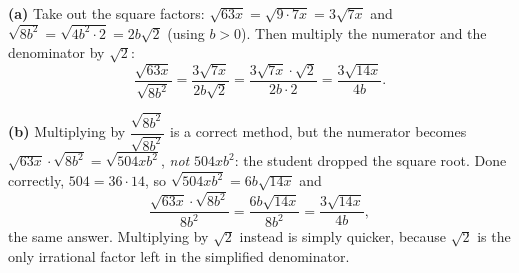 \textbf{(a)} Take out the square factors: $\sqrt{63x}=\sqrt{9\cdot7x}=3\sqrt{7x}$ and $\sqrt{8b^2}=\sqrt{4b^2\cdot2}=2b\sqrt2$ (using $b>0$). Then multiply the numerator and the denominator by $\sqrt2$:
\[
\dfrac{\sqrt{63x}}{\sqrt{8b^2}}=\dfrac{3\sqrt{7x}}{2b\sqrt2}=\dfrac{3\sqrt{7x}\cdot\sqrt2}{2b\cdot2}=\boxed{\dfrac{3\sqrt{14x}}{4b}}.
\]

\textbf{(b)} Multiplying by $\dfrac{\sqrt{8b^2}}{\sqrt{8b^2}}$ is a correct method, but the numerator becomes $\sqrt{63x}\cdot\sqrt{8b^2}=\sqrt{504xb^2}$, \emph{not} $504xb^2$: the student dropped the square root. Done correctly, $504=36\cdot14$, so $\sqrt{504xb^2}=6b\sqrt{14x}$ and
\[
\dfrac{\sqrt{63x}\cdot\sqrt{8b^2}}{8b^2}=\dfrac{6b\sqrt{14x}}{8b^2}=\dfrac{3\sqrt{14x}}{4b},
\]
the same answer. Multiplying by $\sqrt2$ instead is simply quicker, because $\sqrt2$ is the only irrational factor left in the simplified denominator.
